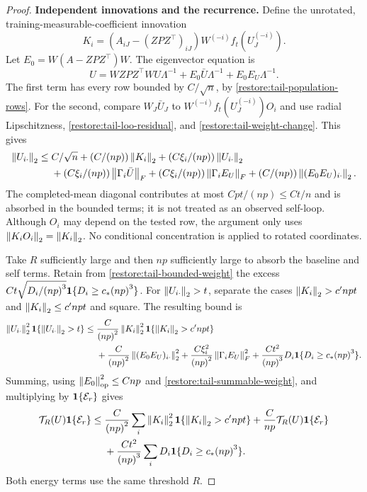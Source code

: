 \begin{proof}
\medskip\noindent\textbf{Independent innovations and the recurrence.}
Define the unrotated, training-measurable-coefficient innovation
\begin{equation}
 K_i=(A_{iJ}-{(ZPZ^\top)_{iJ}})W^{(-i)}f_t(U_J^{(-i)}).
 \label{restore:tail-innovation}
\end{equation}
Let $E_0=W(A-{ZPZ^\top})W$.
The eigenvector equation is
\[
 U=W{ZPZ^\top} WU\Lambda^{-1}+E_0\bar U\Lambda^{-1}+E_0E_U\Lambda^{-1}.
\]
The first term has every row bounded by $C/\sqrt n$, by
\eqref{restore:tail-population-rows}.
For the second, compare $W_J\bar U_J$ to
$W^{(-i)}f_t(U_J^{(-i)})O_i$ and use radial Lipschitzness,
\eqref{restore:tail-loo-residual}, and
\eqref{restore:tail-weight-change}.  This gives
\begin{align}
 \left\lVert U_{i\cdot}\right\rVert_2\le{}&
 C/\sqrt n+(C/(np))\left\lVert K_i\right\rVert_2
 +(C\xi_i/(np))\left\lVert U_{i\cdot}\right\rVert_2\nonumber\\
 &+(C\xi_i/(np))\left\lVert\Gamma_i\bar U\right\rVert_F
 +(C\xi_i/(np))\left\lVert\Gamma_iE_U\right\rVert_F
 +(C/(np))\left\lVert(E_0E_U)_{i\cdot}\right\rVert_2.
 \label{restore:tail-row-recursion}
\end{align}
The completed-mean diagonal contributes at most $Cpt/(np)\le Ct/n$
and is absorbed in the bounded terms; it is not treated as an
observed self-loop.
Although $O_i$ may depend on the tested row, the argument only uses
$\left\lVert K_iO_i\right\rVert_2=\left\lVert K_i\right\rVert_2$.
No conditional concentration is applied to rotated coordinates.

Take $R$ sufficiently large and then ${np}$ sufficiently large to absorb
the baseline and self terms.  Retain from
\eqref{restore:tail-bounded-weight} the excess
$Ct\sqrt{D_i/{(np)}^3}\mathbf1\{D_i\ge c_*{(np)}^3\}$.
For $\left\lVert U_{i\cdot}\right\rVert_2>t$, separate the cases
$\left\lVert K_i\right\rVert_2>c'{np}t$ and $\left\lVert K_i\right\rVert_2\le c'{np}t$ and square.
The resulting bound is
\begin{align}
 \left\lVert U_{i\cdot}\right\rVert_2^2\mathbf1\{\left\lVert U_{i\cdot}\right\rVert_2>t\}
 \le{}&\frac C{{(np)}^2}\left\lVert K_i\right\rVert_2^2
                         \mathbf1\{\left\lVert K_i\right\rVert_2>c'{np}t\}\nonumber\\
 &+\frac C{{(np)}^2}\left\lVert(E_0E_U)_{i\cdot}\right\rVert_2^2
 +\frac{C\xi_i^2}{{(np)}^2}\left\lVert\Gamma_iE_U\right\rVert_F^2
 +\frac{Ct^2}{{(np)}^3}D_i\mathbf1\{D_i\ge c_*{(np)}^3\}.
 \label{restore:tail-pointwise-recursion}
\end{align}
Summing, using $\left\lVert E_0\right\rVert_{\mathrm{op}}^2\le C{np}$ and
\eqref{restore:tail-summable-weight}, and multiplying by
$\mathbf1\{\mathcal E_r\}$ gives
\begin{align}
 \mathcal T_R(U)\mathbf1\{\mathcal E_r\}
 \le{}&\frac C{{(np)}^2}\sum_i\left\lVert K_i\right\rVert_2^2
                         \mathbf1\{\left\lVert K_i\right\rVert_2>c'{np}t\}
 +\frac C{np}\mathcal T_R(U)\mathbf1\{\mathcal E_r\}\nonumber\\
 &+\frac{Ct^2}{{(np)}^3}\sum_iD_i\mathbf1\{D_i\ge c_*{(np)}^3\}.
 \label{restore:tail-energy-recursion}
\end{align}
Both energy terms use the same threshold $R$.


\end{proof}
